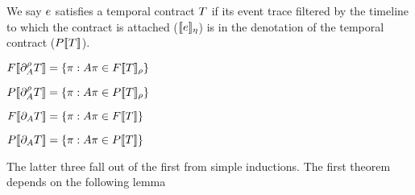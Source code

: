 %
We say $e$ satisfies a temporal contract $T$ if its event trace filtered by the timeline to which the contract is attached ($[\![ e ]\!]_\eta$) is in the denotation of the temporal contract ($P[\![ T ]\!]$).
%

\begin{theorem}[Full]
 $F[\![ \partial_{A}^{\rho}{T} ]\!] = \left\{\pi : A\pi \in F[\![ T ]\!]_{\rho}\right\}$
\end{theorem}

\begin{theorem}[Partial]
 $P[\![ \partial_{A}^{\rho}{T} ]\!] = \left\{\pi : A\pi \in P[\![ T ]\!]_{\rho}\right\}$
\end{theorem}

\begin{theorem}
 $F[\![ \partial_{A}{T} ]\!] = \left\{\pi : A\pi \in F[\![ T ]\!]\right\}$
\end{theorem}

\begin{theorem}
 $P[\![ \partial_{A}{T} ]\!] = \left\{\pi : A\pi \in P[\![ T ]\!]\right\}$
\end{theorem}

The latter three fall out of the first from simple inductions.
%
The first theorem depends on the following lemma

